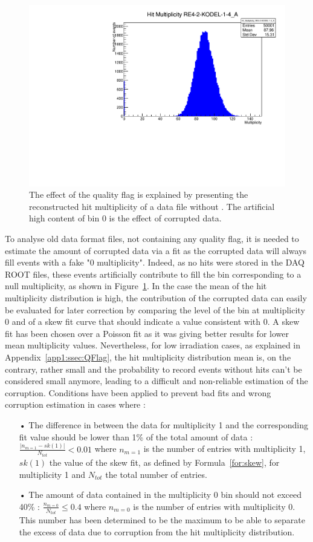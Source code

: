 	\begin{figure}[H]
        \centering
		\includegraphics[width = 0.7\linewidth]{fig/app1/No_Qflag_nhits_KODEL.pdf}
		\caption{\label{fig:corrupted} The effect of the quality flag is explained by presenting the reconstructed hit multiplicity of a data file without . The artificial high content of bin 0 is the effect of corrupted data.}
	\end{figure}
	
	To analyse old data format files, not containing any quality flag, it is needed to estimate the amount of corrupted data via a fit as the corrupted data will always fill events with a fake "0 multiplicity". Indeed, as no hits were stored in the DAQ ROOT files, these events artificially contribute to fill the bin corresponding to a null multiplicity, as shown in Figure~\ref{fig:corrupted}. In the case the mean of the hit multiplicity distribution is high, the contribution of the corrupted data can easily be evaluated for later correction by comparing the level of the bin at multiplicity 0 and of a skew fit curve that should indicate a value consistent with 0. A skew fit has been chosen over a Poisson fit as it was giving better results for lower mean multiplicity  values. Nevertheless, for low irradiation cases, as explained in Appendix~\ref{app1:ssec:QFlag}, the hit multiplicity distribution mean is, on the contrary, rather small and the probability to record events without hits can't be considered small anymore, leading to a difficult and non-reliable estimation of the corruption. Conditions have been applied to prevent bad fits and wrong corruption estimation in cases where :

	\begin{itemize}
		\item[•] The difference in between the data for multiplicity 1 and the corresponding fit value should be lower than 1\% of the total amount of data : $\frac{\vert n_{m=1} - sk(1)\vert}{N_{tot}} < 0.01$ where $n_{m=1}$ is the number of entries with multiplicity 1, $sk(1)$ the value of the skew fit, as defined by Formula~\ref{for:skew}, for multiplicity 1 and $N_{tot}$ the total number of entries.
		\item[•] The amount of data contained in the multiplicity 0 bin should not exceed 40\% : $\frac{n_{m=0}}{N_{tot}} \leq 0.4$ where $n_{m=0}$ is the number of entries with multiplicity 0. This number has been determined to be the maximum to be able to separate the excess of data due to corruption from the hit multiplicity distribution.
	\end{itemize}
	
